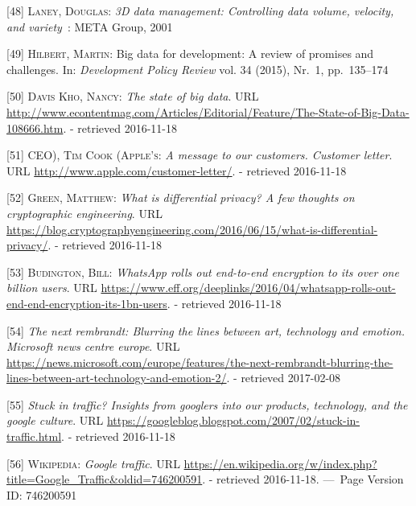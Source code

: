 \documentclass[12pt,english,a4paper,titlepage,cleardoublepage=empty,dottedtoc]{report}
\begin{document}
\hypertarget{ref-report_2001_3d-data-management-controlling-data-volume-velocity-and-variety}{}
{[}48{]} \textsc{Laney, Douglas}: \emph{3D data management: Controlling
data volume, velocity, and variety}~: META Group, 2001

\hypertarget{ref-paper_2015_big-data-for-development-a-review-of-promises-and-challenges:more-data}{}
{[}49{]} \textsc{Hilbert, Martin}: Big data for development: A review of
promises and challenges. In: \emph{Development Policy Review} vol. 34
(2015), Nr.~1, pp.~135--174

\hypertarget{ref-web_2016_the-state-of-big-data}{}
{[}50{]} \textsc{Davis Kho, Nancy}: \emph{The state of big data}. URL
\url{http://www.econtentmag.com/Articles/Editorial/Feature/The-State-of-Big-Data-108666.htm}.
- retrieved 2016-11-18

\hypertarget{ref-web_2016_apple_customer-letter}{}
{[}51{]} \textsc{CEO), Tim Cook (Apple's}: \emph{A message to our
customers. Customer letter}. URL
\url{http://www.apple.com/customer-letter/}. - retrieved 2016-11-18

\hypertarget{ref-web_2016_what-is-differential-privacy}{}
{[}52{]} \textsc{Green, Matthew}: \emph{What is differential privacy? A
few thoughts on cryptographic engineering}. URL
\url{https://blog.cryptographyengineering.com/2016/06/15/what-is-differential-privacy/}.
- retrieved 2016-11-18

\hypertarget{ref-web_2016_eff_whatsapp-rolls-out-emd-to-end-encryption}{}
{[}53{]} \textsc{Budington, Bill}: \emph{WhatsApp rolls out end-to-end
encryption to its over one billion users}. URL
\url{https://www.eff.org/deeplinks/2016/04/whatsapp-rolls-out-end-end-encryption-its-1bn-users}.
- retrieved 2016-11-18

\hypertarget{ref-web_2016_research-experiment_ai-rembrandt}{}
{[}54{]} \emph{The next rembrandt: Blurring the lines between art,
technology and emotion. Microsoft news centre europe}. URL
\url{https://news.microsoft.com/europe/features/the-next-rembrandt-blurring-the-lines-between-art-technology-and-emotion-2/}.
- retrieved 2017-02-08

\hypertarget{ref-web_2007_introducing-google-traffic}{}
{[}55{]} \emph{Stuck in traffic? Insights from googlers into our
products, technology, and the google culture}. URL
\url{https://googleblog.blogspot.com/2007/02/stuck-in-traffic.html}. -
retrieved 2016-11-18

\hypertarget{ref-web_2016_wikipedia_google-traffic}{}
{[}56{]} \textsc{Wikipedia}: \emph{Google traffic}. URL
\url{https://en.wikipedia.org/w/index.php?title=Google_Traffic\&oldid=746200591}.
- retrieved 2016-11-18. ---~Page Version ID: 746200591
\end{document}
